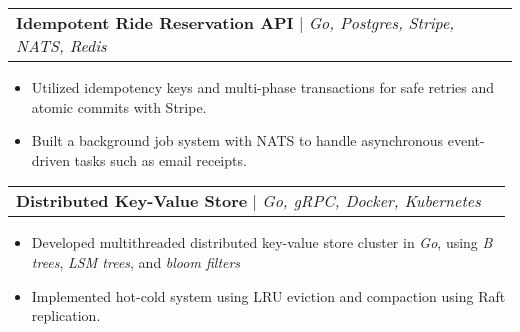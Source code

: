 \documentclass[letterpaper,11pt]{article}
\makeatletter
\newcommand{\resumeItem}[1]{
  \item\small{
    {#1 \vspace{-2pt}}
  }
}
\newcommand{\resumeProjectHeading}[2]{
    \item
    \begin{tabular*}{0.97\textwidth}{l@{\extracolsep{\fill}}r}
      \small#1 & #2 \\
    \end{tabular*}\vspace{-7pt}
}
\newcommand{\resumeItemListStart}{\begin{itemize}}
\newcommand{\resumeItemListEnd}{\end{itemize}\vspace{-5pt}}
\makeatother
\begin{document}
        \resumeProjectHeading
        {\textbf{Idempotent Ride Reservation API} $|$ \emph{Go, Postgres, Stripe, NATS, Redis}}{}
        \resumeItemListStart
            \resumeItem{Utilized idempotency keys and multi-phase transactions for safe retries and atomic commits with Stripe.}
            \resumeItem{Built a background job system with NATS to handle asynchronous event-driven tasks such as email receipts.}
        \resumeItemListEnd

  

        \resumeProjectHeading
          {\textbf{Distributed Key-Value Store} $|$ \emph{Go, gRPC, Docker, Kubernetes}}{}
          \resumeItemListStart
            \resumeItem{Developed multithreaded distributed key-value store cluster in \textit{Go}, using \textit{B trees}, \textit{LSM trees}, and \textit{bloom filters}}
            \resumeItem{Implemented hot-cold system using LRU eviction and compaction using Raft replication. }
          \resumeItemListEnd

        


\end{document}
